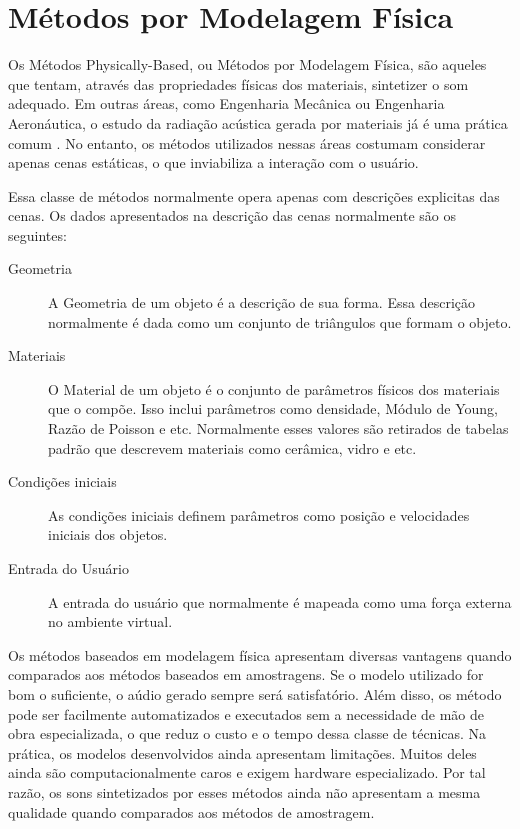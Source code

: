 \section{Métodos por Modelagem Física}

Os Métodos Physically-Based, ou Métodos por Modelagem Física, são aqueles que tentam, através das propriedades físicas dos materiais, sintetizer o som adequado. Em outras áreas, como Engenharia Mecânica ou Engenharia Aeronáutica, o estudo da radiação acústica gerada por materiais já é uma prática comum \cite{pierce1981acoustics}. No entanto, os métodos utilizados nessas áreas costumam considerar apenas cenas estáticas, o que inviabiliza a interação com o usuário.

Essa classe de métodos normalmente opera apenas com descrições explicitas das cenas. Os dados apresentados na descrição das cenas normalmente são os seguintes:

\begin{description}
	\item[Geometria] A Geometria de um objeto é a descrição de sua forma. Essa descrição normalmente é dada como um conjunto de triângulos que formam o objeto.
	\item[Materiais] O Material de um objeto é o conjunto de parâmetros físicos dos materiais que o compõe. Isso inclui parâmetros como densidade, Módulo de Young, Razão de Poisson e etc. Normalmente esses valores são retirados de tabelas padrão que descrevem materiais como cerâmica, vidro e etc.
	\item[Condições iniciais] As condições iniciais definem parâmetros como posição e velocidades iniciais dos objetos.
	\item[Entrada do Usuário] A entrada do usuário que normalmente é mapeada como uma força externa no ambiente virtual.
\end{description}

Os métodos baseados em modelagem física apresentam diversas vantagens quando comparados aos métodos baseados em amostragens. Se o modelo utilizado for bom o suficiente, o aúdio gerado sempre será satisfatório. Além disso, os método pode ser facilmente automatizados e executados sem a necessidade de mão de obra especializada, o que reduz o custo e o tempo dessa classe de técnicas. Na prática, os modelos desenvolvidos ainda apresentam limitações. Muitos deles ainda são computacionalmente caros e exigem hardware especializado. Por tal razão, os sons sintetizados por esses métodos ainda não apresentam a mesma qualidade quando comparados aos métodos de amostragem.

